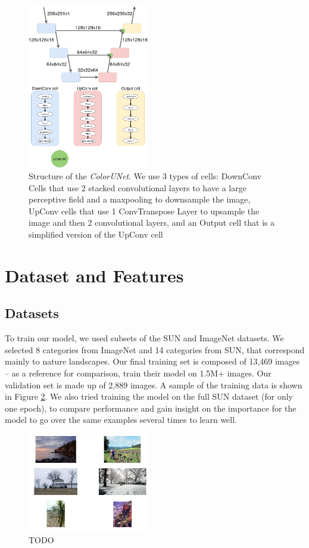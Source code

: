 \documentclass[10pt,twocolumn,letterpaper]{article}
\begin{document}
\begin{figure}
\begin{center}
\includegraphics[width=200px]{diagram}
\caption{Structure of the \textit{ColorUNet}. We use 3 types of cells: DownConv Cells that use 2 stacked convolutional layers to have a large perceptive field and a maxpooling to downsample the image, UpConv cells that use 1 ConvTranspose Layer to upsample the image and then 2 convolutional layers, and an Output cell that is a simplified version of the UpConv cell}
\label{structure}
\end{center}
\end{figure}

\section{Dataset and Features}

\subsection{Datasets}
To train our model, we used subsets of the SUN \cite{xiao2010sun} and ImageNet \cite{russakovsky2015imagenet} datasets. We selected 8 categories from ImageNet and 14 categories from SUN, that correspond mainly to nature landscapes. Our final training set is composed of 13,469 images -- as a reference for comparison, \cite{zhang2016colorful} train their model on 1.5M+ images. Our validation set is made up of 2,889 images. A sample of the training data is shown in Figure \ref{sampletrain}.
We also tried training the model on the full SUN dataset (for only one epoch), to compare performance and gain insight on the importance for the model to go over the same examples several times to learn well.

\begin{figure}
\begin{center}
\includegraphics[width=200px]{sampletrain.png}
\caption{TODO}
\label{sampletrain}
\end{center}
\end{figure}
\end{document}
